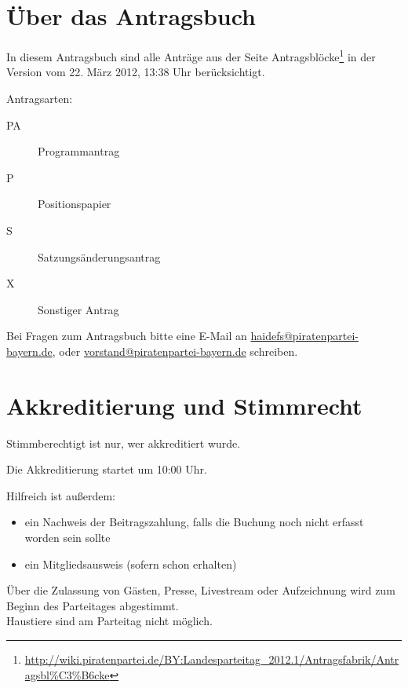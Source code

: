 \section{Über das Antragsbuch}

In diesem Antragsbuch sind alle Anträge aus der Seite \glqq Antragsblöcke\grqq\footnote{
\url{http://wiki.piratenpartei.de/BY:Landesparteitag_2012.1/Antragsfabrik/Antragsbl\%C3\%B6cke}
} in der Version vom
22. März 2012, 13:38 Uhr
berücksichtigt.


Antragsarten:
\begin{description}
	\item[PA] Programmantrag
	\item[P] Positionspapier
	\item[S] Satzungsänderungsantrag
	\item[X]  Sonstiger Antrag
\end{description}


Bei Fragen zum Antragsbuch bitte eine E-Mail  an \url{haidefs@piratenpartei-bayern.de}, oder \url{vorstand@piratenpartei-bayern.de} schreiben.

\section{Akkreditierung und Stimmrecht}
Stimmberechtigt ist nur, wer akkreditiert wurde.

Die Akkreditierung startet um 10:00 Uhr.



Hilfreich ist außerdem:
\begin{itemize}
	\item ein Nachweis der Beitragszahlung, falls die Buchung noch nicht erfasst worden sein sollte
	\item ein Mitgliedsausweis (sofern schon erhalten)
\end{itemize}



Über die Zulassung von Gästen, Presse, Livestream oder Aufzeichnung wird zum Beginn des Parteitages abgestimmt.\\
Haustiere sind am Parteitag nicht möglich.
